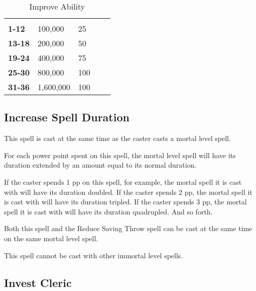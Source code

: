\begin{multicols*}{2}
\begin {table}[H]
  \caption{Improve Ability}\label{tab:Improve Ability}
  \begin{tabularx}{\columnwidth}{>{\bfseries}YYYYY}
	 &  & \\
	1-12 & 100,000 & 25\\
	13-18 & 200,000 & 50\\
	19-24 & 400,000 & 75\\
	25-30 & 800,000 & 100\\
	31-36 & 1,600,000 & 100
  \end {tabularx}
\end {table}

\subsection{Increase Spell Duration}

This spell is cast at the same time as the caster casts a mortal level spell.

For each power point spent on this spell, the mortal level spell will have its duration extended by an amount equal to its normal duration.

If the caster spends 1 pp on this spell, for example, the mortal spell it is cast with will have its duration doubled. If the caster spends 2 pp, the mortal spell it is cast with will have its duration tripled. If the caster spends 3 pp, the mortal spell it is cast with will have its duration quadrupled. And so forth.

Both this spell and the Reduce Saving Throw spell can be cast at the same time on the same mortal level spell.

This spell cannot be cast with other immortal level spells.

\subsection{Invest Cleric}


\end{multicols*}
